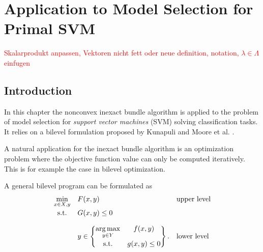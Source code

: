 \section{Application to Model Selection for Primal SVM}

\textcolor{red}{Skalarprodukt anpassen, Vektoren nicht fett oder neue definition, notation, \(\lambda \in \Lambda\) einfugen}

\subsection{Introduction}

In this chapter the nonconvex inexact bundle algorithm is applied to the problem of model selection for \emph{support vector machines} (SVM) solving classification tasks.
It relies on a bilevel formulation proposed by Kunapuli \cite{Kunapuli2008} and Moore et al. \cite{Moore2011}.

A natural application for the inexact bundle algorithm is an optimization problem where the objective function value can only be computed iteratively. This is for example the case in bilevel optimization.

A general bilevel program can be formulated as \cite{Kunapuli2008}
\begin{equation}
	\begin{array}{cll}
	\displaystyle\min_{x \in X, y} & F(x,y) & \text{upper level} \vspace{0.5ex}\\
	\text{s.t.} & G(x,y) \leq 0 & \vspace{1em}\\
	& y \in \begin{Bmatrix} \displaystyle\argmax_{y\in Y} & f(x,y) \vspace{0.5ex}\\
	                        \text{s.t.} & g(x,y) \leq 0 
													\end{Bmatrix}. & \text{lower level}
	\end{array}
\end{equation}

